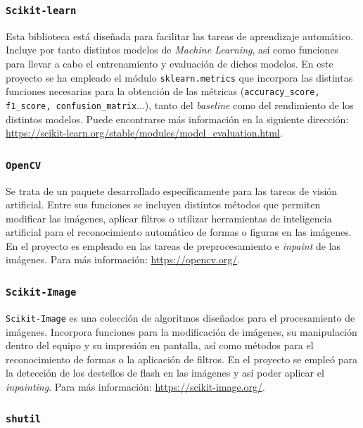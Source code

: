 \subsubsection{\texttt{Scikit-learn}}

Esta biblioteca está diseñada para facilitar las tareas de aprendizaje automático. Incluye por tanto distintos modelos de \textit{Machine Learning}, así como funciones para llevar a cabo el entrenamiento y evaluación de dichos modelos. En este proyecto se ha empleado el módulo \texttt{sklearn.metrics} que incorpora las distintas funciones necesarias para la obtención de las métricas (\texttt{accuracy\_score, f1\_score, confusion\_matrix}...), tanto del \textit{baseline} como del rendimiento de los distintos modelos. Puede encontrarse más información en la siguiente dirección: \url{https://scikit-learn.org/stable/modules/model_evaluation.html}.

\subsubsection{\texttt{OpenCV}}

Se trata de un paquete desarrollado específicamente para las tareas de visión artificial. Entre sus funciones se incluyen distintos métodos que permiten modificar las imágenes, aplicar filtros o utilizar herramientas de inteligencia artificial para el reconocimiento automático de formas o figuras en las imágenes. En el proyecto es empleado en las tareas de preprocesamiento e \textit{inpaint} de las imágenes. Para más información: \url{https://opencv.org/}.

\subsubsection{\texttt{Scikit-Image}}

\texttt{Scikit-Image} es una colección de algoritmos diseñados para el procesamiento de imágenes. Incorpora funciones para la modificación de imágenes, su manipulación dentro del equipo y su impresión en pantalla, así como métodos para el reconocimiento de formas o la aplicación de filtros. En el proyecto se empleó para la detección de los destellos de flash en las imágenes y así poder aplicar el \textit{inpainting}. Para más información: \url{https://scikit-image.org/}.

\subsubsection{\texttt{shutil}}

